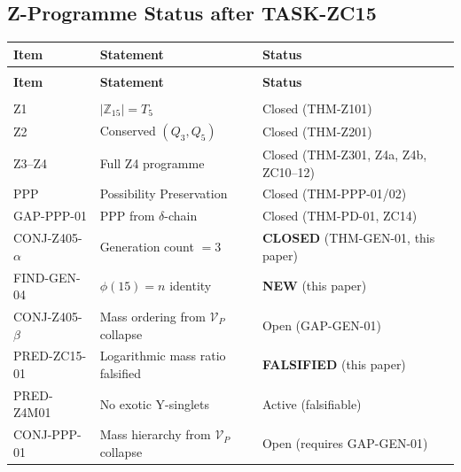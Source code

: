 \documentclass[12pt, a4paper]{article}
\begin{document}
\subsection{Z-Programme Status after TASK-ZC15}
\label{zc15:sec:status}

\begin{derivedbox}[title={Z-Programme Status after TASK-ZC15}]
{\small
\renewcommand{\arraystretch}{1.30}
\begin{longtable}{>{\centering\arraybackslash}p{2.5cm}
                  >{\raggedright\arraybackslash}p{7.5cm}
                  >{\raggedright\arraybackslash}p{2.8cm}}
\toprule
\textbf{Item} & \textbf{Statement} & \textbf{Status} \\
\midrule
\endfirsthead
\multicolumn{3}{l}{\small\textit{(continued)}} \\[4pt]
\toprule
\textbf{Item} & \textbf{Statement} & \textbf{Status} \\
\midrule
\endhead
\midrule
\multicolumn{3}{r}{\small\textit{(continues)}} \\
\endfoot
\bottomrule
\endlastfoot
Z1        & $|\mathbb{Z}_{15}|=T_5$
           & Closed (THM-Z101) \\
Z2        & Conserved $(Q_3,Q_5)$
           & Closed (THM-Z201) \\
Z3--Z4    & Full Z4 programme
           & Closed (THM-Z301, Z4a, Z4b, ZC10--12) \\
PPP       & Possibility Preservation
           & Closed (THM-PPP-01/02) \\
GAP-PPP-01 & PPP from $\delta$-chain
           & Closed (THM-PD-01, ZC14) \\
CONJ-Z405-$\alpha$ & Generation count $= 3$
           & \textbf{CLOSED} (THM-GEN-01, this paper) \\
FIND-GEN-04 & $\phi(15)=n$ identity
           & \textbf{NEW} (this paper) \\
\midrule
CONJ-Z405-$\beta$ & Mass ordering from $\mathcal{V}_P$ collapse
           & Open (GAP-GEN-01) \\
PRED-ZC15-01 & Logarithmic mass ratio falsified
           & \textbf{FALSIFIED} (this paper) \\
PRED-Z4M01 & No exotic Y-singlets
           & Active (falsifiable) \\
CONJ-PPP-01 & Mass hierarchy from $\mathcal{V}_P$ collapse
           & Open (requires GAP-GEN-01) \\
\end{longtable}
}
\end{derivedbox}
\end{document}
